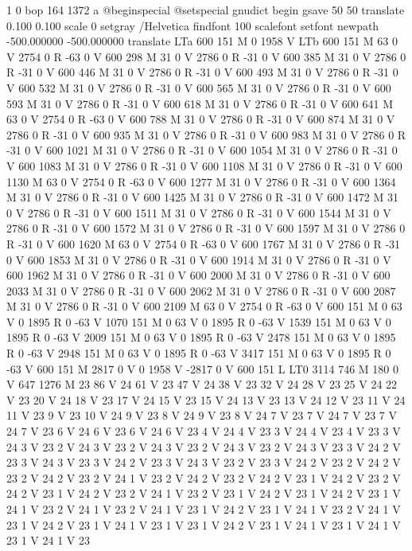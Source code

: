 1 0 bop 164 1372 a @beginspecial @setspecial
 gnudict begin gsave 50 50 translate 0.100 0.100 scale 0 setgray /Helvetica
findfont 100 scalefont setfont newpath -500.000000 -500.000000 translate
LTa 600 151 M 0 1958 V LTb 600 151 M 63 0 V 2754 0 R -63 0 V 600 298
M 31 0 V 2786 0 R -31 0 V 600 385 M 31 0 V 2786 0 R -31 0 V 600 446
M 31 0 V 2786 0 R -31 0 V 600 493 M 31 0 V 2786 0 R -31 0 V 600 532
M 31 0 V 2786 0 R -31 0 V 600 565 M 31 0 V 2786 0 R -31 0 V 600 593
M 31 0 V 2786 0 R -31 0 V 600 618 M 31 0 V 2786 0 R -31 0 V 600 641
M 63 0 V 2754 0 R -63 0 V 600 788 M 31 0 V 2786 0 R -31 0 V 600 874
M 31 0 V 2786 0 R -31 0 V 600 935 M 31 0 V 2786 0 R -31 0 V 600 983
M 31 0 V 2786 0 R -31 0 V 600 1021 M 31 0 V 2786 0 R -31 0 V 600 1054
M 31 0 V 2786 0 R -31 0 V 600 1083 M 31 0 V 2786 0 R -31 0 V 600 1108
M 31 0 V 2786 0 R -31 0 V 600 1130 M 63 0 V 2754 0 R -63 0 V 600 1277
M 31 0 V 2786 0 R -31 0 V 600 1364 M 31 0 V 2786 0 R -31 0 V 600 1425
M 31 0 V 2786 0 R -31 0 V 600 1472 M 31 0 V 2786 0 R -31 0 V 600 1511
M 31 0 V 2786 0 R -31 0 V 600 1544 M 31 0 V 2786 0 R -31 0 V 600 1572
M 31 0 V 2786 0 R -31 0 V 600 1597 M 31 0 V 2786 0 R -31 0 V 600 1620
M 63 0 V 2754 0 R -63 0 V 600 1767 M 31 0 V 2786 0 R -31 0 V 600 1853
M 31 0 V 2786 0 R -31 0 V 600 1914 M 31 0 V 2786 0 R -31 0 V 600 1962
M 31 0 V 2786 0 R -31 0 V 600 2000 M 31 0 V 2786 0 R -31 0 V 600 2033
M 31 0 V 2786 0 R -31 0 V 600 2062 M 31 0 V 2786 0 R -31 0 V 600 2087
M 31 0 V 2786 0 R -31 0 V 600 2109 M 63 0 V 2754 0 R -63 0 V 600 151
M 0 63 V 0 1895 R 0 -63 V 1070 151 M 0 63 V 0 1895 R 0 -63 V 1539 151
M 0 63 V 0 1895 R 0 -63 V 2009 151 M 0 63 V 0 1895 R 0 -63 V 2478 151
M 0 63 V 0 1895 R 0 -63 V 2948 151 M 0 63 V 0 1895 R 0 -63 V 3417 151
M 0 63 V 0 1895 R 0 -63 V 600 151 M 2817 0 V 0 1958 V -2817 0 V 600
151 L LT0 3114 746 M 180 0 V 647 1276 M 23 86 V 24 61 V 23 47 V 24
38 V 23 32 V 24 28 V 23 25 V 24 22 V 23 20 V 24 18 V 23 17 V 24 15
V 23 15 V 24 13 V 23 13 V 24 12 V 23 11 V 24 11 V 23 9 V 23 10 V 24
9 V 23 8 V 24 9 V 23 8 V 24 7 V 23 7 V 24 7 V 23 7 V 24 7 V 23 6 V
24 6 V 23 6 V 24 6 V 23 4 V 24 4 V 23 3 V 24 4 V 23 4 V 23 3 V 24 3
V 23 2 V 24 3 V 23 2 V 24 3 V 23 2 V 24 3 V 23 2 V 24 3 V 23 3 V 24
2 V 23 3 V 24 3 V 23 3 V 24 2 V 23 3 V 24 3 V 23 2 V 23 3 V 24 2 V
23 2 V 24 2 V 23 2 V 24 2 V 23 2 V 24 1 V 23 2 V 24 2 V 23 2 V 24 2
V 23 1 V 24 2 V 23 2 V 24 2 V 23 1 V 24 2 V 23 2 V 24 1 V 23 2 V 23
1 V 24 2 V 23 1 V 24 2 V 23 1 V 24 1 V 23 2 V 24 1 V 23 2 V 24 1 V
23 1 V 24 2 V 23 1 V 24 1 V 23 2 V 24 1 V 23 1 V 24 2 V 23 1 V 24 1
V 23 1 V 23 1 V 24 2 V 23 1 V 24 1 V 23 1 V 24 1 V 23 1 V 24 1 V 23
